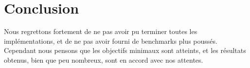 \section*{Conclusion}

Nous regrettons fortement de ne pas avoir pu terminer toutes les implémentations, et de ne pas avoir fourni de benchmarks plus poussés. Cependant nous pensons que les objectifs minimaux sont atteints, et les résultats obtenus, bien que peu nombreux, sont en accord avec nos attentes.